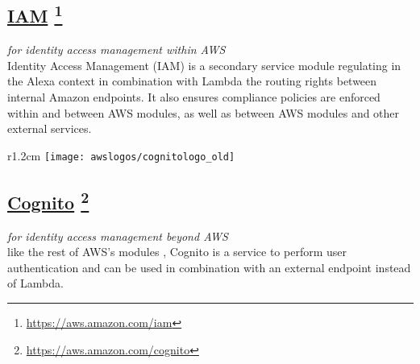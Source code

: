 \subsection*{
\href{https://aws.amazon.com/iam/}{\textbf{IAM}} \footnote{\url{https://aws.amazon.com/iam}}
}
	\textit{for identity access management within AWS}\\
	Identity Access Management (IAM) is a secondary service module regulating in the Alexa context in combination with Lambda the routing rights between internal Amazon endpoints. It also ensures compliance policies are enforced within and between AWS modules, as well as between AWS modules and other external services.
%	



\begin{wrapfigure}[2]{r}{1.2cm}
	\texttt{[image: awslogos/cognitologo\_old]}
\end{wrapfigure}


\subsection*{
\href{https://aws.amazon.com/cognito/}{\textbf{Cognito}} \footnote{\url{https://aws.amazon.com/cognito}}
}
	\textit{for identity access management beyond AWS}\\
	like the rest of AWS's modules%
	, Cognito is a %
	service 
	to perform user authentication and can be used in combination with an external endpoint instead of Lambda.\\
	


	

\clearpage


